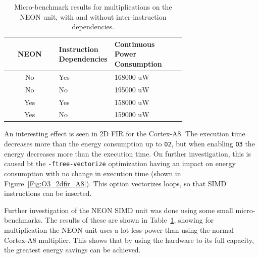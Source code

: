 \documentclass[twocolumn]{article}
\let\oldcaption\caption
\renewcommand{\caption}[1]{\oldcaption{\textup{#1}}}
\begin{document}
\begin{table}
	\centering
	\begin{tabular}{c p{0.3\linewidth} p{0.4\linewidth}}
		\bfseries NEON & \bfseries Instruction Dependencies & \bfseries Continuous Power Consumption \\
		\hline
		No & \centering Yes & {\hspace{0.85cm} 168000 uW } \\
		No & \centering No & {\hspace{0.85cm} 195000 uW } \\
		Yes & \centering Yes & {\hspace{0.85cm} 158000 uW } \\
		Yes & \centering No & {\hspace{0.85cm} 159000 uW } \\
	\end{tabular}
	\caption{Micro-benchmark results for multiplications on the NEON unit, with and without inter-instruction dependencies.}
	\label{Table:SIMD}
\end{table}

An interesting effect is seen in 2D FIR for the Cortex-A8. The execution time decreases more than the energy consumption up to \texttt{O2}, but when enabling \texttt{O3} the energy decreases more than the execution time. On further investigation, this is caused bt the \texttt{-ftree-vectorize} optimization having an impact on energy consumption with no change in execution time (shown in Figure~\ref{Fig:O3_2dfir_A8}). This option vectorizes loops, so that SIMD instructions can be inserted.

Further investigation of the NEON SIMD unit was done using some small micro-benchmarks. The results of these are shown in Table~\ref{Table:SIMD}, showing for multiplication the NEON unit uses a lot less power than using the normal Cortex-A8 multiplier. This shows that by using the hardware to its full capacity, the greatest energy savings can be achieved.

\end{document}
